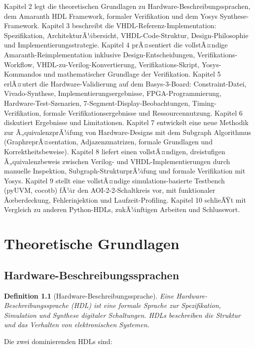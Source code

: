 ﻿\documentclass[12pt,a4paper]{report}
\newtheorem{definition}{Definition}[section]
\begin{document}
Kapitel 2 legt die theoretischen Grundlagen zu Hardware-Beschreibungssprachen, dem Amaranth HDL Framework, formaler Verifikation und dem Yosys Synthese-Framework. Kapitel 3 beschreibt die VHDL-Referenz-Implementation: Spezifikation, ArchitekturÃ¼bersicht, VHDL-Code-Struktur, Design-Philosophie und Implementierungsstrategie. Kapitel 4 prÃ¤sentiert die vollstÃ¤ndige Amaranth-Reimplementation inklusive Design-Entscheidungen, Verifikations-Workflow, VHDL-zu-Verilog-Konvertierung, Verifikations-Skript, Yosys-Kommandos und mathematischer Grundlage der Verifikation. Kapitel 5 erlÃ¤utert die Hardware-Validierung auf dem Basys-3-Board: Constraint-Datei, Vivado-Synthese, Implementierungsergebnisse, FPGA-Programmierung, Hardware-Test-Szenarien, 7-Segment-Display-Beobachtungen, Timing-Verifikation, formale Verifikationsergebnisse und Ressourcennutzung. Kapitel 6 diskutiert Ergebnisse und Limitationen. Kapitel 7 entwickelt eine neue Methodik zur Ã„quivalenzprÃ¼fung von Hardware-Designs mit dem Subgraph Algorithmus (GraphreprÃ¤sentation, Adjazenzmatrizen, formale Grundlagen und Korrektheitsbeweise). Kapitel 8 liefert einen vollstÃ¤ndigen, dreistufigen Ã„quivalenzbeweis zwischen Verilog- und VHDL-Implementierungen durch manuelle Inspektion, Subgraph-StrukturprÃ¼fung und formale Verifikation mit Yosys. Kapitel 9 stellt eine vollstÃ¤ndige simulations-basierte Testbench (pyUVM, cocotb) fÃ¼r den AOI-2-2-Schaltkreis vor, mit funktionaler Ãœberdeckung, Fehlerinjektion und Laufzeit-Profiling. Kapitel 10 schlieÃŸt mit Vergleich zu anderen Python-HDLs, zukÃ¼nftigen Arbeiten und Schlusswort.

\chapter{Theoretische Grundlagen}

\section{Hardware-Beschreibungssprachen}

\begin{definition}[Hardware-Beschreibungssprache]
Eine Hardware-Beschreibungssprache (HDL) ist eine formale Sprache zur Spezifikation, Simulation und Synthese digitaler Schaltungen. HDLs beschreiben die Struktur und das Verhalten von elektronischen Systemen.
\end{definition}

Die zwei dominierenden HDLs sind:
\end{document}
